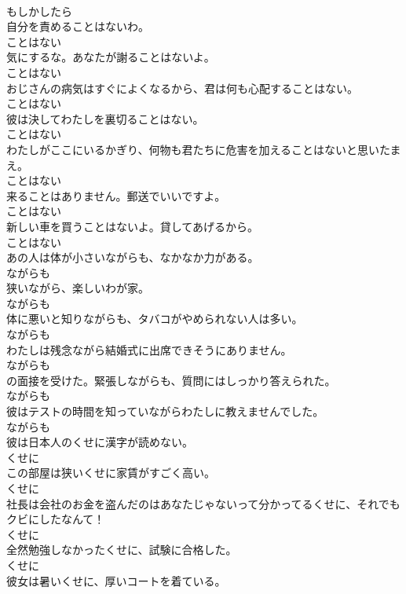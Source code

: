 \documentclass[8pt]{extreport}
\begin{document}
\begin{CJK}{UTF8}{min}
\\	もしかしたら
\\	自分を責めることはないわ。	
\\	ことはない
\\	気にするな。あなたが謝ることはないよ。	
\\	ことはない
\\	おじさんの病気はすぐによくなるから、君は何も心配することはない。	
\\	ことはない
\\	彼は決してわたしを裏切ることはない。	
\\	ことはない
\\	わたしがここにいるかぎり、何物も君たちに危害を加えることはないと思いたまえ。	
\\	ことはない
\\	来ることはありません。郵送でいいですよ。	
\\	ことはない
\\	新しい車を買うことはないよ。貸してあげるから。	
\\	ことはない
\\	あの人は体が小さいながらも、なかなか力がある。	
\\	ながらも
\\	狭いながら、楽しいわが家。	
\\	ながらも
\\	体に悪いと知りながらも、タバコがやめられない人は多い。	
\\	ながらも
\\	わたしは残念ながら結婚式に出席できそうにありません。	
\\	ながらも
\\	の面接を受けた。緊張しながらも、質問にはしっかり答えられた。	
\\	ながらも
\\	彼はテストの時間を知っていながらわたしに教えませんでした。	
\\	ながらも
\\	彼は日本人のくせに漢字が読めない。	
\\	くせに
\\	この部屋は狭いくせに家賃がすごく高い。	
\\	くせに
\\	社長は会社のお金を盗んだのはあなたじゃないって分かってるくせに、それでもクビにしたなんて！	
\\	くせに
\\	全然勉強しなかったくせに、試験に合格した。	
\\	くせに
\\	彼女は暑いくせに、厚いコートを着ている。	

\end{CJK}
\end{document}
